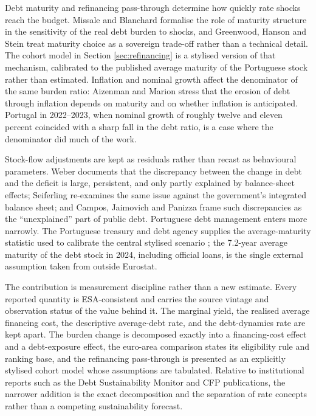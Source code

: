 \documentclass[11pt,a4paper]{article}
\begin{document}
Debt maturity and refinancing pass-through determine how quickly rate shocks
reach the budget. Missale and Blanchard \cite{missale1994} formalise the role
of maturity structure in the sensitivity of the real debt burden to shocks, and
Greenwood, Hanson and Stein \cite{greenwood2015} treat maturity choice as a
sovereign trade-off rather than a technical detail. The cohort model in Section
\ref{sec:refinancing} is a stylised version of that mechanism, calibrated to
the published average maturity of the Portuguese stock rather than estimated.
Inflation and nominal growth affect the denominator of the same burden ratio:
Aizenman and Marion \cite{aizenman2011} stress that the erosion of debt through
inflation depends on maturity and on whether inflation is anticipated. Portugal
in 2022--2023, when nominal growth of roughly twelve and eleven percent
coincided with a sharp fall in the debt ratio, is a case where the denominator
did much of the work.

Stock-flow adjustments are kept as residuals rather than recast as behavioural
parameters. Weber \cite{weber2012} documents that the discrepancy between the
change in debt and the deficit is large, persistent, and only partly explained
by balance-sheet effects; Seiferling \cite{seiferling2013} re-examines the same
issue against the government's integrated balance sheet; and Campos, Jaimovich
and Panizza \cite{campos2006} frame such discrepancies as the ``unexplained''
part of public debt. Portuguese debt management enters more narrowly. The
Portuguese treasury and debt agency supplies the average-maturity statistic
used to calibrate the central stylised scenario \cite{igcp2024}; the 7.2-year
average maturity of the debt stock in 2024, including official loans, is the
single external assumption taken from outside Eurostat.

The contribution is measurement discipline rather than a new estimate. Every
reported quantity is ESA-consistent and carries the source vintage and
observation status of the value behind it. The marginal yield, the realised
average financing cost, the descriptive average-debt rate, and the
debt-dynamics rate are kept apart. The burden change is
decomposed exactly into a financing-cost effect and a debt-exposure effect, the
euro-area comparison states its eligibility rule and ranking base, and the
refinancing pass-through is presented as an explicitly stylised cohort model
whose assumptions are tabulated. Relative to institutional reports such as the
Debt Sustainability Monitor and CFP publications, the narrower addition is the
exact decomposition and the separation of rate concepts rather than a competing
sustainability forecast.
\end{document}
